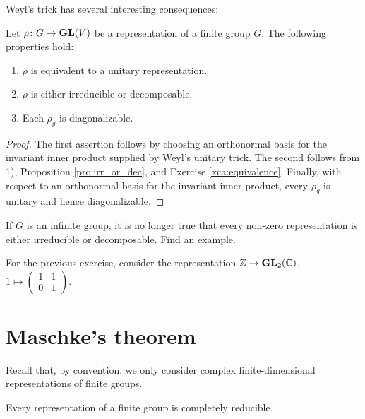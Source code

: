 Weyl's trick has several interesting consequences:  

\begin{corollary}
\label{cor:consequences}
	Let $\rho\colon G\to\mathbf{GL}(V)$ be a representation of a finite group $G$. 
 The following properties
	hold:
	\begin{enumerate}
		\item $\rho$ is equivalent to a unitary representation.
		\item $\rho$ is either irreducible or decomposable.
		\item Each $\rho_g$ is diagonalizable. 
	\end{enumerate}
\end{corollary}

\begin{proof}
  The first assertion follows by choosing an orthonormal basis for the
  invariant inner product supplied by Weyl's unitary trick.  The second follows
  from 1), Proposition \ref{pro:irr_or_dec}, and Exercise
  \ref{xca:equivalence}.  Finally, with respect to an orthonormal basis for the
  invariant inner product, every $\rho_g$ is unitary and hence diagonalizable.
\end{proof}

\begin{exercise}
\label{xca:not_decomposable}
    If $G$ is an infinite group, it is no longer true that every non-zero representation
    is either irreducible or decomposable. Find an example.
\end{exercise}

For the previous exercise, consider the representation $\mathbb{Z}\to\mathbf{GL}_2(\mathbb{C})$, 
$1\mapsto\begin{pmatrix}1&1\\0&1\end{pmatrix}$. 
\section{Maschke's theorem} 

Recall that, by convention, we only consider complex 
finite-dimensional representations of finite groups.

\begin{theorem}[Maschke]
    Every representation of a finite group is completely reducible.
\end{theorem}

